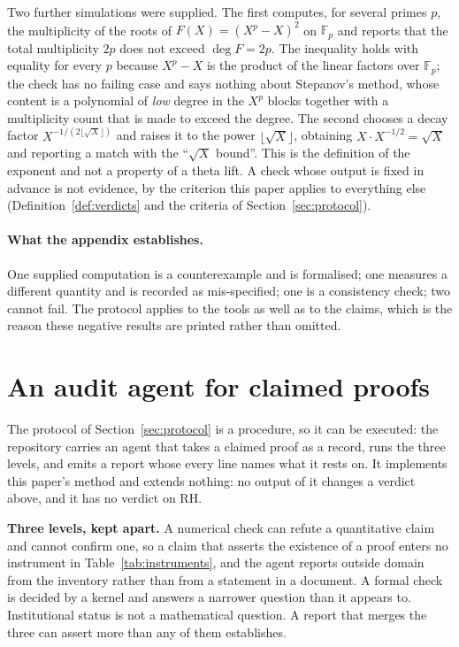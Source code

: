 \documentclass[11pt,a4paper]{article}
\newcommand{\RH}{\mathrm{RH}}
\newcommand{\verdict}[1]{\textsf{#1}}
\begin{document}
Two further simulations were supplied. The first computes, for several primes $p$, the
multiplicity of the roots of $F(X)=(X^p-X)^2$ on $\mathbb{F}_p$ and reports that the total
multiplicity $2p$ does not exceed $\deg F=2p$. The inequality holds with equality for every $p$
because $X^p-X$ is the product of the linear factors over $\mathbb{F}_p$; the check has no failing
case and says nothing about Stepanov's method, whose content is a polynomial of \emph{low} degree in
the $X^p$ blocks together with a multiplicity count that is made to exceed the degree. The second
chooses a decay factor $X^{-1/(2\lfloor\sqrt X\rfloor)}$ and raises it to the power
$\lfloor\sqrt X\rfloor$, obtaining $X\cdot X^{-1/2}=\sqrt X$ and reporting a match with the
``$\sqrt X$ bound''. This is the definition of the exponent and not a property of a theta lift. A
check whose output is fixed in advance is not evidence, by the criterion this paper applies to
everything else (Definition~\ref{def:verdicts} and the criteria of Section~\ref{sec:protocol}).

\paragraph{What the appendix establishes.} One supplied computation is a counterexample
and is formalised; one measures a different quantity and is recorded as mis-specified; one is a
consistency check; two cannot fail. The protocol applies to the tools as well as to the claims,
which is the reason these negative results are printed rather than omitted.

\section{An audit agent for claimed proofs}
\label{app:agent}

The protocol of Section~\ref{sec:protocol} is a procedure, so it can be executed: the
repository carries an agent that takes a claimed proof as a record, runs the three levels, and
emits a report whose every line names what it rests on. It implements this paper's method and
extends nothing: no output of it changes a verdict above, and it has no verdict on $\RH$.

\textbf{Three levels, kept apart.} A numerical check can refute a quantitative claim and
cannot confirm one, so a claim that asserts the existence of a proof enters no instrument in
Table~\ref{tab:instruments}, and the agent reports \verdict{outside domain} from the inventory
rather than from a statement in a document. A formal check is decided by a kernel and answers a
narrower question than it appears to. Institutional status is not a mathematical question. A report
that merges the three can assert more than any of them establishes.
\end{document}
